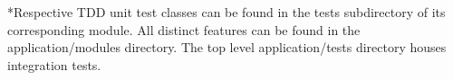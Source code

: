 \documentclass[]{final_report}
\theoremstyle{definition}
\begin{document}
*Respective TDD unit test classes can be found in the tests subdirectory of its corresponding module. All distinct features can be found in the application/modules directory. The top level application/tests directory houses integration tests.

\end{document}
